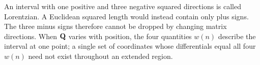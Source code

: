 An interval with one positive and three negative squared directions is
called Lorentzian. A Euclidean squared length would instead contain only
plus signs. The three minus signs therefore cannot be dropped by changing
matrix directions. When \(\mathbf{Q}\) varies with position, the four quantities
\(w(n)\) describe the interval at one point; a single set of
coordinates whose differentials equal all four \(w(n)\) need not exist
throughout an extended region.
